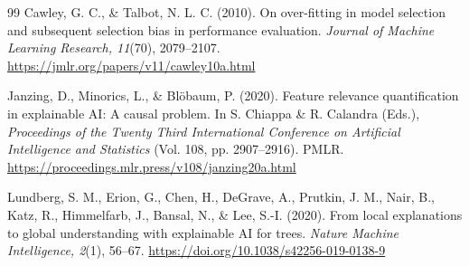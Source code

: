 \begin{thebibliography}{99}
Cawley, G. C., \& Talbot, N. L. C. (2010). On over-fitting in model selection and subsequent selection bias in performance evaluation. \emph{Journal of Machine Learning Research, 11}(70), 2079--2107. \url{https://jmlr.org/papers/v11/cawley10a.html}

Janzing, D., Minorics, L., \& Blöbaum, P. (2020). Feature relevance quantification in explainable AI: A causal problem. In S. Chiappa \& R. Calandra (Eds.), \emph{Proceedings of the Twenty Third International Conference on Artificial Intelligence and Statistics} (Vol. 108, pp. 2907--2916). PMLR. \url{https://proceedings.mlr.press/v108/janzing20a.html}

Lundberg, S. M., Erion, G., Chen, H., DeGrave, A., Prutkin, J. M., Nair, B., Katz, R., Himmelfarb, J., Bansal, N., \& Lee, S.-I. (2020). From local explanations to global understanding with explainable AI for trees. \emph{Nature Machine Intelligence, 2}(1), 56--67. \url{https://doi.org/10.1038/s42256-019-0138-9}

\end{thebibliography}
